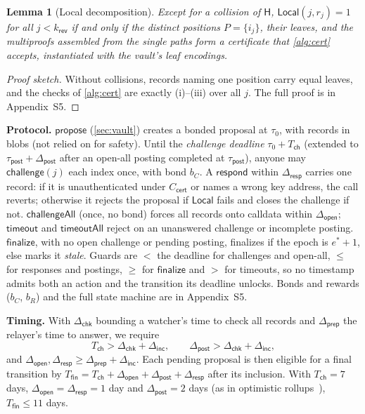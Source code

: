 \documentclass[10pt,journal,compsoc]{IEEEtran}
\theoremstyle{tplain}
\newtheorem{lemma}[theorem]{Lemma}
\theoremstyle{tdef}
\theoremstyle{remark}
\newcommand{\supp}[1]{Appendix~#1}
\newcommand{\kr}{k_{\mathsf{rev}}}
\newcommand{\cert}{\mathsf{cert}}
\newcommand{\Hash}{\mathsf{H}}
\begin{document}
\begin{lemma}[Local decomposition]\label{lem:local}
Except for a collision of $\Hash$, $\mathsf{Local}(j,r_j)=1$ for all $j<\kr$ if and only if the distinct positions $P=\{i_j\}$, their leaves, and the multiproofs assembled from the single paths form a certificate that \cref{alg:cert} accepts, instantiated with the vault's leaf encodings.
\end{lemma}
\begin{proof}[Proof sketch]
Without collisions, records naming one position carry equal leaves, and the checks of \cref{alg:cert} are exactly (i)--(iii) over all $j$. The full proof is in \supp{S5}.
\end{proof}

\noindent\textbf{Protocol.} $\mathsf{propose}$ (\cref{sec:vault}) creates a bonded proposal at $\tau_0$, with records in blobs (not relied on for safety). Until the \emph{challenge deadline} $\tau_0+T_{\mathsf{ch}}$ (extended to $\tau_{\mathsf{post}}+\Delta_{\mathsf{post}}$ after an open-all posting completed at $\tau_{\mathsf{post}}$), anyone may $\mathsf{challenge}(j)$ each index once, with bond $b_C$. A $\mathsf{respond}$ within $\Delta_{\mathsf{resp}}$ carries one record: if it is unauthenticated under $C_{\cert}$ or names a wrong key address, the call reverts; otherwise it rejects the proposal if $\mathsf{Local}$ fails and closes the challenge if not. $\mathsf{challengeAll}$ (once, no bond) forces all records onto calldata within $\Delta_{\mathsf{open}}$; $\mathsf{timeout}$ and $\mathsf{timeoutAll}$ reject on an unanswered challenge or incomplete posting. $\mathsf{finalize}$, with no open challenge or pending posting, finalizes if the epoch is $e^\ast+1$, else marks it \emph{stale}. Guards are $<$ the deadline for challenges and open-all, $\le$ for responses and postings, $\ge$ for $\mathsf{finalize}$ and $>$ for timeouts, so no timestamp admits both an action and the transition its deadline unlocks. Bonds and rewards ($b_C$, $b_R$) and the full state machine are in \supp{S5}.

\noindent\textbf{Timing.} With $\Delta_{\mathsf{chk}}$ bounding a watcher's time to check all records and $\Delta_{\mathsf{prep}}$ the relayer's time to answer, we require
\[
T_{\mathsf{ch}}> \Delta_{\mathsf{chk}}+\Delta_{\mathsf{inc}},\qquad \Delta_{\mathsf{post}}> \Delta_{\mathsf{chk}}+\Delta_{\mathsf{inc}},
\]
and $\Delta_{\mathsf{open}},\Delta_{\mathsf{resp}}\ge\Delta_{\mathsf{prep}}+\Delta_{\mathsf{inc}}$. Each pending proposal is then eligible for a final transition by $T_{\mathsf{fin}}=T_{\mathsf{ch}}+\Delta_{\mathsf{open}}+\Delta_{\mathsf{post}}+\Delta_{\mathsf{resp}}$ after its inclusion. With $T_{\mathsf{ch}}=7$ days, $\Delta_{\mathsf{open}}=\Delta_{\mathsf{resp}}=1$ day and $\Delta_{\mathsf{post}}=2$ days (as in optimistic rollups~\cite{kalodner2018arbitrum}), $T_{\mathsf{fin}}\le 11$ days.
\end{document}
